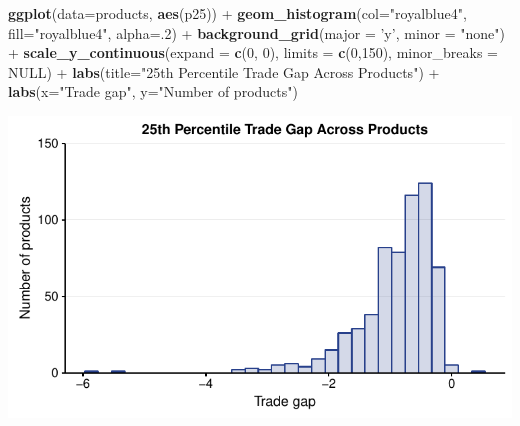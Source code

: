\documentclass[10pt,]{article}
\newenvironment{Shaded}{\begin{snugshade}}{\end{snugshade}}
\newcommand{\KeywordTok}[1]{\textcolor[rgb]{0.13,0.29,0.53}{\textbf{{#1}}}}
\newcommand{\DataTypeTok}[1]{\textcolor[rgb]{0.13,0.29,0.53}{{#1}}}
\newcommand{\DecValTok}[1]{\textcolor[rgb]{0.00,0.00,0.81}{{#1}}}
\newcommand{\StringTok}[1]{\textcolor[rgb]{0.31,0.60,0.02}{{#1}}}
\newcommand{\OtherTok}[1]{\textcolor[rgb]{0.56,0.35,0.01}{{#1}}}
\newcommand{\NormalTok}[1]{{#1}}
\begin{document}
\begin{Shaded}
\begin{Highlighting}[]
\KeywordTok{ggplot}\NormalTok{(}\DataTypeTok{data=}\NormalTok{products, }\KeywordTok{aes}\NormalTok{(p25)) +}
\StringTok{  }\KeywordTok{geom_histogram}\NormalTok{(}\DataTypeTok{col=}\StringTok{"royalblue4"}\NormalTok{,}
                 \DataTypeTok{fill=}\StringTok{"royalblue4"}\NormalTok{,}
                 \DataTypeTok{alpha=}\NormalTok{.}\DecValTok{2}\NormalTok{) +}
\StringTok{  }\KeywordTok{background_grid}\NormalTok{(}\DataTypeTok{major =} \StringTok{'y'}\NormalTok{, }\DataTypeTok{minor =} \StringTok{"none"}\NormalTok{) +}
\StringTok{  }\KeywordTok{scale_y_continuous}\NormalTok{(}\DataTypeTok{expand =} \KeywordTok{c}\NormalTok{(}\DecValTok{0}\NormalTok{, }\DecValTok{0}\NormalTok{),  }\DataTypeTok{limits =} \KeywordTok{c}\NormalTok{(}\DecValTok{0}\NormalTok{,}\DecValTok{150}\NormalTok{), }\DataTypeTok{minor_breaks =} \OtherTok{NULL}\NormalTok{) +}
\StringTok{  }\KeywordTok{labs}\NormalTok{(}\DataTypeTok{title=}\StringTok{"25th Percentile Trade Gap Across Products"}\NormalTok{) +}
\StringTok{  }\KeywordTok{labs}\NormalTok{(}\DataTypeTok{x=}\StringTok{"Trade gap"}\NormalTok{, }\DataTypeTok{y=}\StringTok{"Number of products"}\NormalTok{)}
\end{Highlighting}
\end{Shaded}

\begin{center}\includegraphics{Figs/value_products-3} \end{center}
\end{document}
